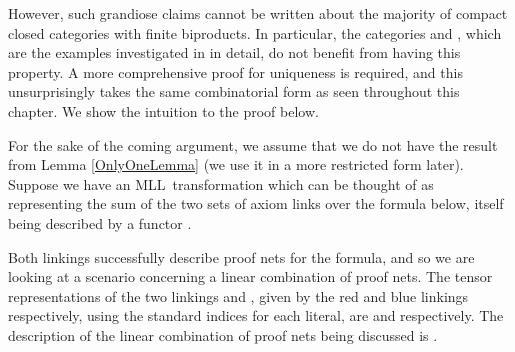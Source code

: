 \documentclass{LMCS}
\theoremstyle{plain}\newtheorem*{cLm}{Claim}
\newcommand{\mll}{MLL} \newcommand{\mall}{MALL}
\newcommand{\p}{} \newcommand{\N}{\mathbb{N}}
\begin{document}
  \p However, such grandiose claims cannot be written about the majority of compact closed categories with finite biproducts. In particular, the categories  and , which are the examples investigated in \cite{Tan97} in detail, do not benefit from having this property. A more comprehensive proof for uniqueness is required, and this unsurprisingly takes the same combinatorial form as seen throughout this chapter. We show the intuition to the proof below.
  
  \p For the sake of the coming argument, we assume that we do not have the result from Lemma \ref{OnlyOneLemma} (we use it in a more restricted form later). Suppose we have an \mll~transformation  which can be thought of as representing the sum of the two sets of axiom links over the formula below, itself being described by a functor .
  
  \begin{center} \vspace{5mm}
   \vspace{5mm}
  \end{center}
 
 \noindent Both linkings successfully describe proof nets for the formula, and so we are looking at a scenario concerning a linear combination of proof nets. The tensor representations of the two linkings  and , given by the red and blue linkings respectively, using the standard indices for each literal, are  and  respectively. The description of the linear combination of proof nets being discussed is .
  
\end{document}
